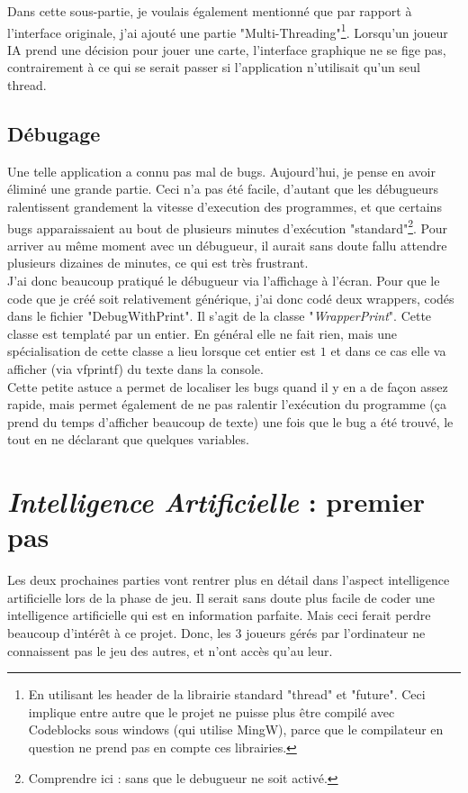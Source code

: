 \documentclass[a4paper,11pt]{article}
\begin{document}
Dans cette sous-partie, je voulais également mentionné que par rapport à l'interface originale, j'ai ajouté une partie "Multi-Threading"\footnote{En utilisant les header de la librairie standard "thread" et "future". Ceci implique entre autre que le projet ne puisse plus être compilé avec Codeblocks sous windows (qui utilise MingW), parce que le compilateur en question ne prend pas en compte ces librairies.}. Lorsqu'un joueur IA prend une décision pour jouer une carte, l'interface graphique ne se fige pas, contrairement à ce qui se serait passer si l'application n'utilisait qu'un seul thread.

\subsection{Débugage}
Une telle application a connu pas mal de bugs. Aujourd'hui, je pense en avoir éliminé une grande partie. Ceci n'a pas été facile, d'autant que les débugueurs ralentissent grandement la vitesse d'execution des programmes, et que certains bugs apparaissaient au bout de plusieurs minutes d'exécution "standard"\footnote{Comprendre ici : sans que le debugueur ne soit activé.}. Pour arriver au même moment avec un débugueur, il aurait sans doute fallu attendre plusieurs dizaines de minutes, ce qui est très frustrant. \\

J'ai donc beaucoup pratiqué le débugueur via l'affichage à l'écran. Pour que le code que je créé soit relativement générique, j'ai donc codé deux wrappers, codés dans le fichier "DebugWithPrint". Il s'agit de la classe "\textit{WrapperPrint}". Cette classe est templaté par un entier. En général elle ne fait rien, mais une spécialisation de cette classe a lieu lorsque cet entier est $1$ et dans ce cas elle va afficher (via vfprintf) du texte dans la console. \\
Cette petite astuce a permet de localiser les bugs quand il y en a de façon assez rapide, mais permet également de ne pas ralentir l'exécution du programme (ça prend du temps d'afficher beaucoup de texte) une fois que le bug a été trouvé, le tout en ne déclarant que quelques variables.
\clearpage
\section{\textit{Intelligence Artificielle} : premier pas}
Les deux prochaines parties vont rentrer plus en détail dans l'aspect intelligence artificielle lors de la phase de jeu. Il serait sans doute plus facile de coder une intelligence artificielle qui est en information parfaite. Mais ceci ferait perdre beaucoup d'intérêt à ce projet. Donc, les 3 joueurs gérés par l'ordinateur ne connaissent pas le jeu des autres, et n'ont accès qu'au leur.\\
\end{document}
